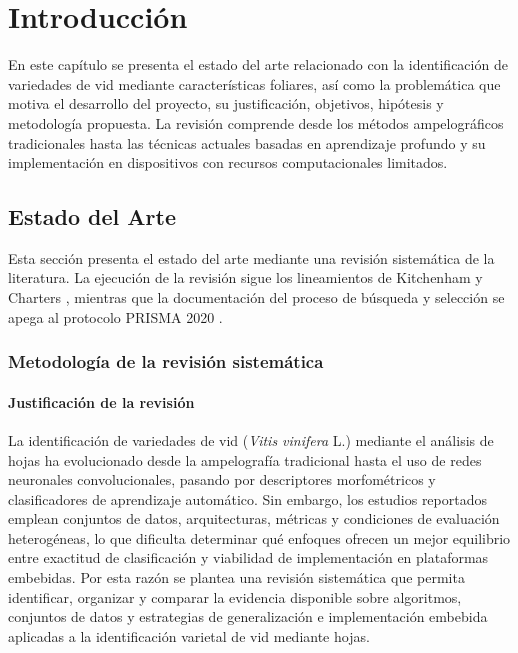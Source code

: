 
\chapter{Introducción}

En este capítulo se presenta el estado del arte relacionado con la
identificación de variedades de vid mediante características foliares, así
como la problemática que motiva el desarrollo del proyecto, su
justificación, objetivos, hipótesis y metodología propuesta. La revisión
comprende desde los métodos ampelográficos tradicionales hasta las técnicas
actuales basadas en aprendizaje profundo y su implementación en dispositivos
con recursos computacionales limitados.

\section{Estado del Arte}

Esta sección presenta el estado del arte mediante una revisión sistemática de
la literatura. La ejecución de la revisión sigue los lineamientos de
Kitchenham y Charters \citep{kitchenham2007}, mientras que la documentación
del proceso de búsqueda y selección se apega al protocolo PRISMA 2020
\citep{page2021prisma}.

\subsection{Metodología de la revisión sistemática}

\subsubsection{Justificación de la revisión}

La identificación de variedades de vid (\textit{Vitis vinifera} L.) mediante
el análisis de hojas ha evolucionado desde la ampelografía tradicional hasta
el uso de redes neuronales convolucionales, pasando por descriptores
morfométricos y clasificadores de aprendizaje automático. Sin embargo, los
estudios reportados emplean conjuntos de datos, arquitecturas, métricas y
condiciones de evaluación heterogéneas, lo que dificulta determinar qué
enfoques ofrecen un mejor equilibrio entre exactitud de clasificación y
viabilidad de implementación en plataformas embebidas. Por esta razón se
plantea una revisión sistemática que permita identificar, organizar y
comparar la evidencia disponible sobre algoritmos, conjuntos de datos y
estrategias de generalización e implementación embebida aplicadas a la
identificación varietal de vid mediante hojas.

